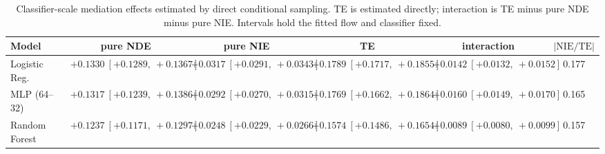 \begin{table}[htbp]
  \centering
  \caption{Classifier-scale mediation effects estimated by direct conditional sampling. TE is estimated directly; interaction is TE minus pure NDE minus pure NIE. Intervals hold the fitted flow and classifier fixed.}
  \label{tab:adult_gap_overall}
  \begin{tabular}{lccccc}
    \toprule
    Model & pure NDE & pure NIE & TE & interaction & $|\mathrm{NIE}/\mathrm{TE}|$ \\
    \midrule
    Logistic Reg. & $+0.1330\ [+0.1289,\ +0.1367]$ & $+0.0317\ [+0.0291,\ +0.0343]$ & $+0.1789\ [+0.1717,\ +0.1855]$ & $+0.0142\ [+0.0132,\ +0.0152]$ & 0.177 \\
    MLP (64--32) & $+0.1317\ [+0.1239,\ +0.1386]$ & $+0.0292\ [+0.0270,\ +0.0315]$ & $+0.1769\ [+0.1662,\ +0.1864]$ & $+0.0160\ [+0.0149,\ +0.0170]$ & 0.165 \\
    Random Forest & $+0.1237\ [+0.1171,\ +0.1297]$ & $+0.0248\ [+0.0229,\ +0.0266]$ & $+0.1574\ [+0.1486,\ +0.1654]$ & $+0.0089\ [+0.0080,\ +0.0099]$ & 0.157 \\
    \bottomrule
  \end{tabular}
\end{table}